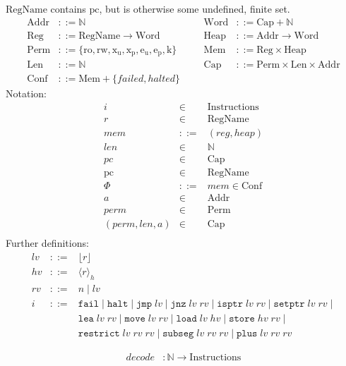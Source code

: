 \documentclass{article}
\newcommand{\hv}{hv}
\newcommand{\rv}{rv}
\newcommand{\lv}{lv}
\newcommand{\pc}{\mathit{pc}}
\newcommand{\pcreg}{\mathrm{pc}}
\newcommand{\addr}{a}
\newcommand{\len}{len}
\newcommand{\mem}{mem}
\newcommand{\reg}{reg}
\newcommand{\heap}{heap}
\newcommand{\perm}{perm}
\newcommand{\failed}{failed}
\newcommand{\halted}{halted}
\newcommand{\decode}{\mathit{decode}}
\newcommand{\plaindom}[1]{\mathrm{#1}}
\newcommand{\Caps}{\plaindom{Cap}}
\newcommand{\Words}{\plaindom{Word}}
\newcommand{\Addrs}{\plaindom{Addr}}
\newcommand{\Mems}{\plaindom{Mem}}
\newcommand{\RegName}{\plaindom{RegName}}
\newcommand{\Regs}{\plaindom{Reg}}
\newcommand{\Heaps}{\plaindom{Heap}}
\newcommand{\Confs}{\plaindom{Conf}}
\newcommand{\Lens}{\plaindom{Len}}
\newcommand{\Instrs}{\plaindom{Instructions}}
\newcommand{\nats}{\mathbb{N}}
\newcommand{\Perms}{\plaindom{Perm}}
\newcommand{\refreg}[1]{\lfloor #1 \rfloor}
\newcommand{\refheap}[1]{\langle #1 \rangle_h}
\newcommand{\instr}[1]{\mathtt{#1}}
\newcommand{\fail}{\instr{fail}}
\newcommand{\halt}{\instr{halt}}
\newcommand{\oneinstr}[2]{\instr{#1} \; #2}
\newcommand{\jmp}[1]{\oneinstr{jmp}{#1}}
\newcommand{\twoinstr}[3]{\instr{#1} \; #2 \; #3}
\newcommand{\jnz}[2]{\twoinstr{jnz}{#1}{#2}}
\newcommand{\isptr}[2]{\twoinstr{isptr}{#1}{#2}}
\newcommand{\setptr}[2]{\twoinstr{setptr}{#1}{#2}}
\newcommand{\move}[2]{\twoinstr{move}{#1}{#2}}
\newcommand{\store}[2]{\twoinstr{store}{#1}{#2}}
\newcommand{\load}[2]{\twoinstr{load}{#1}{#2}}
\newcommand{\lea}[2]{\twoinstr{lea}{#1}{#2}}
\newcommand{\threeinstr}[4]{\instr{#1} \; #2 \; #3 \; #4}
\newcommand{\restrict}[3]{\threeinstr{restrict}{#1}{#2}{#3}}
\newcommand{\subseg}[3]{\threeinstr{subseg}{#1}{#2}{#3}}
\newcommand{\plus}[3]{\threeinstr{plus}{#1}{#2}{#3}}
\newcommand{\plainperm}[1]{\mathrm{#1}}
\newcommand{\readonly}{\plainperm{ro}}
\newcommand{\readwrite}{\plainperm{rw}}
\newcommand{\exec}[1]{\plainperm{x_{#1}}}
\newcommand{\entry}[1]{\plainperm{e_{#1}}}
\newcommand{\key}{\plainperm{k}}
\begin{document}
$\RegName$ contains $\pcreg$, but is otherwise some undefined, finite set.
\begin{align*}
\Addrs &::= \nats & & &
\Words &::= \Caps + \nats \\
\Regs  &::= \RegName \rightarrow \Words & & &
\Heaps &::= \Addrs \rightarrow \Words \\
\Perms &::= \{\readonly, \readwrite, \exec{u}, \exec{p}, \entry{u}, \entry {p}, \key\} & & &
\Mems  &::= \Regs \times \Heaps \\
\Lens  &::= \nats & & &
\Caps  &::= \Perms \times \Lens \times \Addrs \\
\Confs &::= \Mems + \{\failed, \halted\}
\end{align*}
Notation:
$$\begin{array}{rcl}
i      &\in& \Instrs \\
r      &\in& \RegName\\
\mem   &::=& (\reg,\heap)\\
\len   &\in& \nats \\
\pc    &\in& \Caps \\
\pcreg &\in& \RegName \\
\Phi   &::=& \mem \in \Confs\\
\addr      &\in& \Addrs\\
\perm  &\in& \Perms\\
(\perm,len,\addr) &\in& \Caps \\
\end{array}$$
Further definitions:
$$\begin{array}{rcl}
\lv    &::=& \refreg{r} \\
\hv    &::=& \refheap{r}\\
\rv    &::=& n \mid \lv \\
i      &::=& \fail \mid \halt \mid 
             \jmp{\lv} \mid \jnz{\lv}{\rv} \mid
             \isptr{\lv}{\rv} \mid \setptr{\lv}{\rv} \mid \\
       &   & \lea{\lv}{\rv} \mid\move{\lv}{\rv} \mid \load{\lv}{\hv} \mid \store{\hv}{\rv} \mid  \\
       &   & \restrict{\lv}{\rv}{\rv} \mid \subseg{\lv}{\rv}{\rv} \mid \plus{\lv}{\rv}{\rv}
\end{array}$$

\begin{align*}
\decode &:\nats \rightarrow \Instrs
\end{align*}
\end{document}
